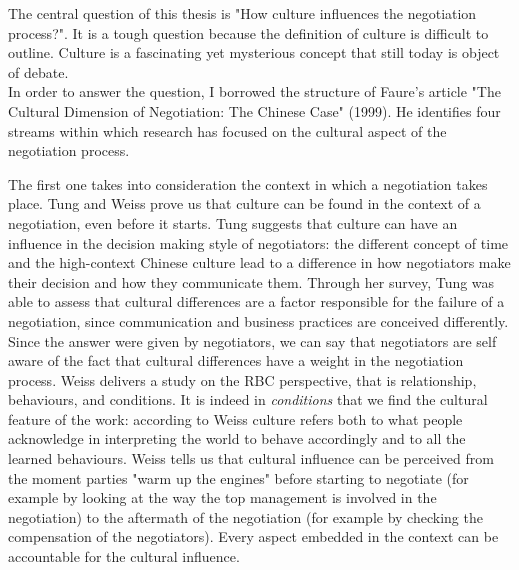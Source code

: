 \documentclass[../main.tex]{subfiles}
\begin{document}
The central question of this thesis is "How culture influences the negotiation process?". It is a tough question because the definition of culture is difficult to outline. Culture is a fascinating yet mysterious concept that still today is object of debate. \\

In order to answer the question, I borrowed the structure of Faure's article "The Cultural Dimension of Negotiation: The Chinese Case" (1999). He identifies four streams within which research has focused on the cultural aspect of the negotiation process.

The first one takes into consideration the context in which a negotiation takes place. Tung and Weiss prove us that culture can be found in the context of a negotiation, even before it starts. Tung suggests that culture can have an influence in the decision making style of negotiators: the different concept of time and the high-context Chinese culture lead to a difference in how negotiators make their decision and how they communicate them.
Through her survey, Tung was able to assess that cultural differences are a factor responsible for the failure of a negotiation, since communication and business practices are conceived differently. Since the answer were given by negotiators, we can say that negotiators are self aware of the fact that cultural differences have a weight in the negotiation process.
Weiss delivers a study on the RBC perspective, that is relationship, behaviours, and conditions. It is indeed in \textit{conditions} that we find the cultural feature of the work: according to Weiss culture refers both to what people acknowledge in interpreting the world to behave accordingly and to all the learned behaviours. 
Weiss tells us that cultural influence can be perceived from the moment parties "warm up the engines" before starting to negotiate (for example by looking at the way the top management is involved in the negotiation) to the aftermath of the negotiation (for example by checking the compensation of the negotiators).
Every aspect embedded in the context can be accountable for the cultural influence.
\end{document}
